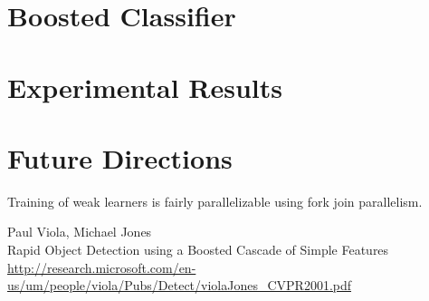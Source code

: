 \documentclass[11pt,twocolumn]{article}
\begin{document}
\section{Boosted Classifier}
\label{sec:boosting}

\section{Experimental Results}

\section{Future Directions}

Training of weak learners is fairly parallelizable using fork join
parallelism. 

\begin{thebibliography}{9}

  Paul Viola, Michael Jones\\
  Rapid Object Detection using a Boosted Cascade of Simple Features\\
  \url{http://research.microsoft.com/en-us/um/people/viola/Pubs/Detect/violaJones_CVPR2001.pdf}

\end{thebibliography}
\end{document}

